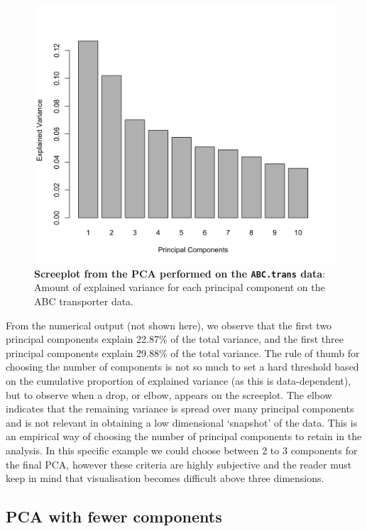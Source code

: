 \documentclass[]{book}
\newenvironment{Shaded}{\begin{snugshade}}{\end{snugshade}}
\newcommand{\CommentTok}[1]{\textcolor[rgb]{0.56,0.35,0.01}{\textit{#1}}}
\begin{document}
\begin{figure}

{\centering \includegraphics[width=0.5\linewidth]{Figures/PCA/screeplot-fig-1} 

}

\caption{\textbf{Screeplot from the PCA performed on the
\texttt{ABC.trans} data}: Amount of explained variance for each
principal component on the ABC transporter data.}\label{fig:screeplot-fig}
\end{figure}

\begin{Shaded}
\end{Shaded}





From the numerical output (not shown here), we observe that the first
two principal components explain 22.87\% of the total variance, and the
first three principal components explain 29.88\% of the total variance.
The rule of thumb for choosing the number of components is not so much
to set a hard threshold based on the cumulative proportion of explained
variance (as this is data-dependent), but to observe when a drop, or
elbow, appears on the screeplot. The elbow indicates that the remaining
variance is spread over many principal components and is not relevant in
obtaining a low dimensional `snapshot' of the data. This is an empirical
way of choosing the number of principal components to retain in the
analysis. In this specific example we could choose between 2 to 3
components for the final PCA, however these criteria are highly
subjective and the reader must keep in mind that visualisation becomes
difficult above three dimensions.

\subsection{PCA with fewer components}\label{pca-with-fewer-components}
\end{document}
